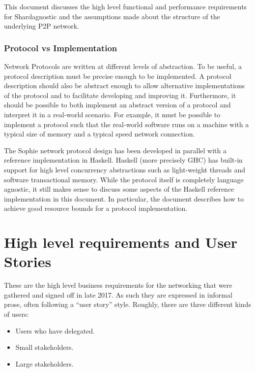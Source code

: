 This document discusses the high level functional and performance requirements for Shardagnostic and the
assumptions made about the structure of the underlying P2P network.

\subsubsection{Protocol vs Implementation}
Network Protocols are written at different levels of abstraction.
To be useful, a protocol description must be precise enough to be implemented.
A protocol description should also be abstract enough to allow alternative implementations of the protocol
and to facilitate developing and improving it.
Furthermore, it should be possible to both implement an
abstract version of a protocol
and interpret it in a real-world scenario.
For example, it must be possible to implement a protocol
such that the real-world software runs on a machine with a typical size of memory
and a typical speed network connection.

The Sophie network protocol design has been developed in parallel
with a reference implementation in Haskell.
Haskell (more precisely GHC) has built-in support for high level concurrency abstractions
such as light-weight threads and software transactional memory.
While the protocol itself is completely language agnostic, it still makes sense to discuss some
aspects of the Haskell reference implementation in this document.
In particular, the document describes how to achieve good resource bounds for
a protocol implementation.




\section{High level requirements and User Stories}

These are the high level business requirements for the networking that were
gathered and signed off in late 2017. As such they are expressed in informal
prose, often following a ``user story'' style.
Roughly, there are three different kinds of users:
\begin{itemize}
\item Users who have delegated.
\item Small stakeholders.
\item Large stakeholders.
\end{itemize}

